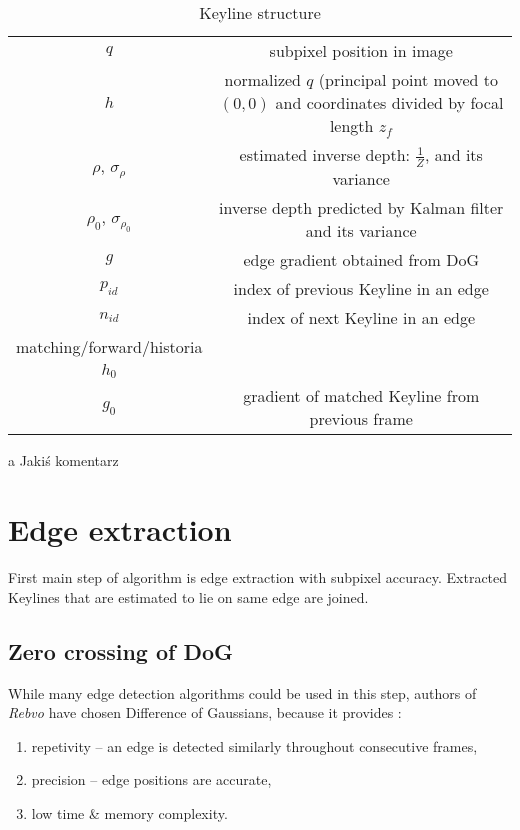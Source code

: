 \begin{table}[h]
	\centering
	
	\begin{threeparttable}
		\caption{Keyline structure}
		\label{tab:keyline}
		
		\begin{tabularx}{0.6\textwidth}{C{1} C{1}}
			\toprule
			 &  \\
			\midrule
			$q$ & subpixel position in image \\
			$h$ & normalized $q$ (principal point moved to $(0,0)$ and coordinates divided by focal length $z_f$ \\
			$\rho$, $\sigma_{\rho}$ & estimated inverse depth: $\frac{1}{Z}$, and its variance \\
			$\rho_0$, $\sigma_{\rho_{0}}$ & inverse depth predicted by Kalman filter and its variance \\
			$g$ & edge gradient obtained from DoG \\
			$p_{id}$ & index of previous Keyline in an edge \\
			$n_{id}$ & index of next Keyline in an edge \\
			
			matching/forward/historia \\
			$h_0$ &  \\
			$g_{0}$ & gradient of matched Keyline from previous frame \\
			\bottomrule
		\end{tabularx}
		
		\begin{tablenotes}
			\footnotesize
			\item[a] Jakiś komentarz\textellipsis
		\end{tablenotes}
		
	\end{threeparttable}
\end{table}


\section{Edge extraction}

First main step of algorithm is edge extraction with subpixel accuracy. Extracted Keylines that are estimated to lie on same edge are joined.

\subsection{Zero crossing of DoG}
While many edge detection algorithms could be used in this step, authors of \textit{Rebvo} have chosen Difference of Gaussians, because it provides \cite{jose2015realtime}:
\begin{enumerate}
	\item repetivity -- an edge is detected similarly throughout consecutive frames,
	\item precision -- edge positions are accurate,
	\item low time \& memory complexity.
\end{enumerate}


